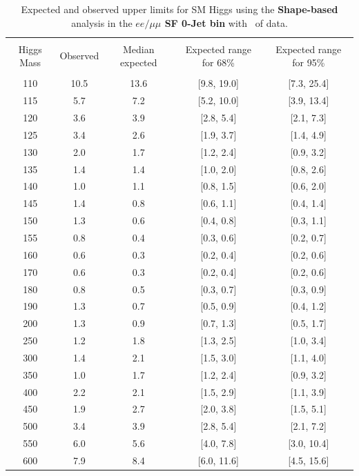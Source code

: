 \begin{table}[hbp!]
\begin{center}
\begin{tabular}{c c c c c}
\hline
\vspace{-3mm} && \\
 Higgs Mass & Observed  & Median expected & Expected range for 68\% & Expected range for 95\%   \\
\vspace{-3mm} && \\
\hline
110 & 10.5 & 13.6 & [9.8, 19.0] & [7.3, 25.4] \\
115 & 5.7 & 7.2 & [5.2, 10.0] & [3.9, 13.4] \\
120 & 3.6 & 3.9 & [2.8, 5.4] & [2.1, 7.3] \\
125 & 3.4 & 2.6 & [1.9, 3.7] & [1.4, 4.9] \\
130 & 2.0 & 1.7 & [1.2, 2.4] & [0.9, 3.2] \\
135 & 1.4 & 1.4 & [1.0, 2.0] & [0.8, 2.6] \\
140 & 1.0 & 1.1 & [0.8, 1.5] & [0.6, 2.0] \\
145 & 1.4 & 0.8 & [0.6, 1.1] & [0.4, 1.4] \\
150 & 1.3 & 0.6 & [0.4, 0.8] & [0.3, 1.1] \\
155 & 0.8 & 0.4 & [0.3, 0.6] & [0.2, 0.7] \\
160 & 0.6 & 0.3 & [0.2, 0.4] & [0.2, 0.6] \\
170 & 0.6 & 0.3 & [0.2, 0.4] & [0.2, 0.6] \\
180 & 0.8 & 0.5 & [0.3, 0.7] & [0.3, 0.9] \\
190 & 1.3 & 0.7 & [0.5, 0.9] & [0.4, 1.2] \\
200 & 1.3 & 0.9 & [0.7, 1.3] & [0.5, 1.7] \\
250 & 1.2 & 1.8 & [1.3, 2.5] & [1.0, 3.4] \\
300 & 1.4 & 2.1 & [1.5, 3.0] & [1.1, 4.0] \\
350 & 1.0 & 1.7 & [1.2, 2.4] & [0.9, 3.2] \\
400 & 2.2 & 2.1 & [1.5, 2.9] & [1.1, 3.9] \\
450 & 1.9 & 2.7 & [2.0, 3.8] & [1.5, 5.1] \\
500 & 3.4 & 3.9 & [2.8, 5.4] & [2.1, 7.2] \\
550 & 6.0 & 5.6 & [4.0, 7.8] & [3.0, 10.4] \\
600 & 7.9 & 8.4 & [6.0, 11.6] & [4.5, 15.6] \\
\hline
\end{tabular}
\caption{Expected and observed upper limits for SM Higgs using the
  {\bf Shape-based} analysis in the {\bf $ee/\mu\mu$ SF 0-Jet bin} with \intlumiEightTeV\ of data.}
\label{tab:bdtbase_uls_0jsf}
\end{center}
\end{table}
